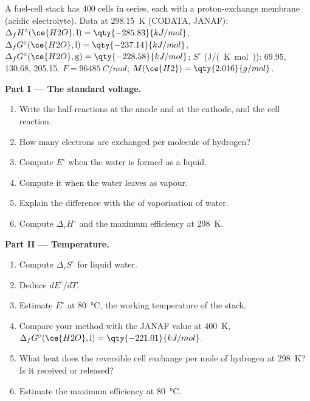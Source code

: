 \begin{problem}
\label{pb:b2:cell-thermodynamics:1}
A fuel-cell stack has 400 cells in series, each with a proton-exchange
membrane (acidic electrolyte). Data at \qty{298.15}{K} (CODATA, JANAF):
$\Delta_f H^\circ(\ce{H2O}, \text{l}) = \qty{-285.83}{kJ/mol}$, $\Delta_f
G^\circ(\ce{H2O}, \text{l}) = \qty{-237.14}{kJ/mol}$, $\Delta_f G^\circ(\ce{H2O},
\text{g}) = \qty{-228.58}{kJ/mol}$; $S^\circ$ (\unit{J/(K.mol)}):  69.95,
 130.68,  205.15. $F = \qty{96485}{C/mol}$; $M(\ce{H2}) =
\qty{2.016}{g/mol}$.

\medskip
\noindent\textbf{Part I --- The standard voltage.}
\begin{enumerate}
  \item Write the half-reactions at the anode and at the cathode, and the cell
        reaction.
  \item How many electrons are exchanged per molecule of hydrogen?
  \item Compute $E^\circ$ when the water is formed as a liquid.
  \item Compute it when the water leaves as vapour.
  \item Explain the difference with the  of vaporisation of water.
  \item Compute $\Delta_r H^\circ$ and the maximum efficiency at \qty{298}{K}.
\end{enumerate}

\medskip
\noindent\textbf{Part II --- Temperature.}
\begin{enumerate}[resume]
  \item Compute $\Delta_r S^\circ$ for liquid water.
  \item Deduce $dE^\circ/dT$.
  \item Estimate $E^\circ$ at \qty{80}{\degreeCelsius}, the working temperature of the
        stack.
  \item Compare your method with the JANAF value at \qty{400}{K}, $\Delta_f
        G^\circ(\ce{H2O}, \text{l}) = \qty{-221.01}{kJ/mol}$.
  \item What heat does the reversible cell exchange per mole of hydrogen at
        \qty{298}{K}? Is it received or released?
  \item Estimate the maximum efficiency at \qty{80}{\degreeCelsius}.
\end{enumerate}


\end{problem}
